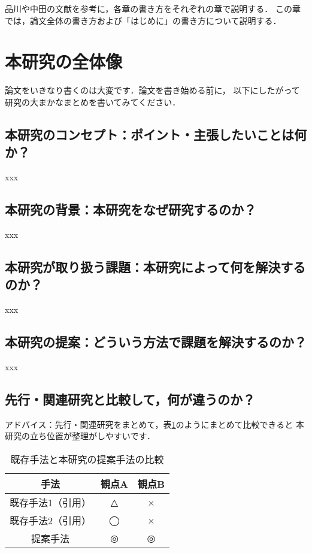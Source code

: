 品川\cite{shinagawa}や中田\cite{nakata}の文献を参考に，各章の書き方をそれぞれの章で説明する．
この章では，論文全体の書き方および「はじめに」の書き方について説明する．

\section{本研究の全体像}
論文をいきなり書くのは大変です．論文を書き始める前に，
以下にしたがって研究の大まかなまとめを書いてみてください．

\subsection*{本研究のコンセプト：ポイント・主張したいことは何か？}
xxx

\subsection*{本研究の背景：本研究をなぜ研究するのか？}
xxx

\subsection*{本研究が取り扱う課題：本研究によって何を解決するのか？}
xxx

\subsection*{本研究の提案：どういう方法で課題を解決するのか？}
xxx

\subsection*{先行・関連研究と比較して，何が違うのか？}
アドバイス：先行・関連研究をまとめて，表\ref{tab:novelty}のようにまとめて比較できると
本研究の立ち位置が整理がしやすいです．

\begin{table}[tb]
    \centering
    \begin{tabular}{c|cc}
        \hline \hline
        手法 & 観点A & 観点B \\
        \hline
        既存手法1（引用） & △ & × \\
        既存手法2（引用） & ◯ & × \\
        提案手法 & ◎ & ◎ \\
        \hline 
    \end{tabular}
    \caption{既存手法と本研究の提案手法の比較}
    \label{tab:novelty}
\end{table}

